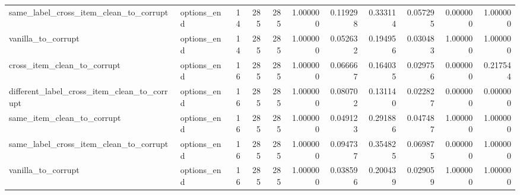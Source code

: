 \begin{tabular}{llrrrrrrrrr}
same\_label\_cross\_item\_clean\_to\_corrupt & options\_end & 14 & 285 & 285 & 1.000000 & 0.119298 & 0.333114 & 0.057295 & 0.000000 & 1.000000 \\
vanilla\_to\_corrupt & options\_end & 14 & 285 & 285 & 1.000000 & 0.052632 & 0.194956 & 0.030483 & 1.000000 & 1.000000 \\
cross\_item\_clean\_to\_corrupt & options\_end & 16 & 285 & 285 & 1.000000 & 0.066667 & 0.164035 & 0.029756 & 0.000000 & 0.217544 \\
different\_label\_cross\_item\_clean\_to\_corrupt & options\_end & 16 & 285 & 285 & 1.000000 & 0.080702 & 0.131140 & 0.022827 & 0.000000 & 0.000000 \\
same\_item\_clean\_to\_corrupt & options\_end & 16 & 285 & 285 & 1.000000 & 0.049123 & 0.291886 & 0.047487 & 1.000000 & 1.000000 \\
same\_label\_cross\_item\_clean\_to\_corrupt & options\_end & 16 & 285 & 285 & 1.000000 & 0.094737 & 0.354825 & 0.069875 & 0.000000 & 1.000000 \\
vanilla\_to\_corrupt & options\_end & 16 & 285 & 285 & 1.000000 & 0.038596 & 0.200439 & 0.029059 & 1.000000 & 1.000000 \\
\bottomrule
\end{tabular}
